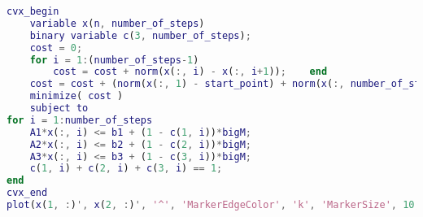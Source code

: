 \begin{lstlisting}[language=Matlab]
cvx_begin
    variable x(n, number_of_steps)
    binary variable c(3, number_of_steps);
    cost = 0;
    for i = 1:(number_of_steps-1)
        cost = cost + norm(x(:, i) - x(:, i+1));    end
    cost = cost + (norm(x(:, 1) - start_point) + norm(x(:, number_of_steps) - finish_point))*weight;
    minimize( cost )
    subject to
for i = 1:number_of_steps
	A1*x(:, i) <= b1 + (1 - c(1, i))*bigM;
	A2*x(:, i) <= b2 + (1 - c(2, i))*bigM;
	A3*x(:, i) <= b3 + (1 - c(3, i))*bigM;
	c(1, i) + c(2, i) + c(3, i) == 1;
end
cvx_end
plot(x(1, :)', x(2, :)', '^', 'MarkerEdgeColor', 'k', 'MarkerSize', 10, 'LineWidth', 2); hold on;    
\end{lstlisting}
